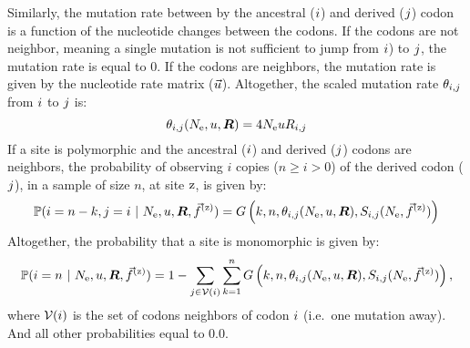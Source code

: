 Similarly, the mutation rate between by the ancestral (${i}$) and derived (${j}$) codon is a function of the nucleotide changes between the codons.
If the codons are not neighbor, meaning a single mutation is not sufficient to jump from ${i}$) to ${j}$, the mutation rate is equal to $0$.
If the codons are neighbors, the mutation rate is given by the nucleotide rate matrix ($\vec{u}$).
Altogether, the scaled mutation rate $\theta_{{i}, {j}}$ from ${i}$ to ${j}$ is:
\begin{equation}
	\theta_{{i}, {j}}(N_{\text{e}}, u, \bm{R}) = 4 N_{\text{e}} u R_{{i}, {j}}
\end{equation}
If a site is polymorphic and the ancestral (${i}$) and derived (${j}$) codons are neighbors, the probability of observing $i$ copies ($n \geq i > 0$) of the derived codon (${j}$), in a sample of size $n$, at site $\text{z}$, is given by:
\begin{equation}
	\mathbb{P} ({i}=n-k,{j}=i \ |\ N_{\text{e}}, u, \bm{R}, \vec{f}^{(\text{z})}) = G\left(k, n, \theta_{{i}, {j}}(N_{\text{e}}, u, \bm{R}), S_{{i}, {j}}(N_{\text{e}}, \vec{f}^{(\text{z})}) \right)
\end{equation}
Altogether, the probability that a site is monomorphic is given by:
\begin{equation}
	\mathbb{P} ({i}= n \ |\ N_{\text{e}}, u, \bm{R}, \vec{f}^{(\text{z})}) = 1 - \sum\limits_{{j} \in \mathcal{V} ({i})} \sum\limits_{k=1}^{n} G\left(k, n, \theta_{{i}, {j}}(N_{\text{e}}, u, \bm{R}), S_{{i}, {j}}(N_{\text{e}}, \vec{f}^{(\text{z})})\right),
\end{equation}
where $ \mathcal{V} ({i})$ is the set of codons neighbors of codon ${i}$ (i.e.~one mutation away).
And all other probabilities equal to $0.0$.
